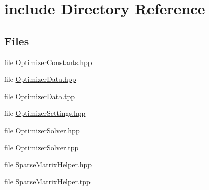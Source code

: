 \section{include Directory Reference}
\label{dir_d44c64559bbebec7f509842c48db8b23}
\subsection*{Files}
\begin{DoxyCompactItemize}
\item 
file \hyperlink{OptimizerConstants_8hpp}{Optimizer\+Constants.\+hpp}
\item 
file \hyperlink{OptimizerData_8hpp}{Optimizer\+Data.\+hpp}
\item 
file \hyperlink{OptimizerData_8tpp}{Optimizer\+Data.\+tpp}
\item 
file \hyperlink{OptimizerSettings_8hpp}{Optimizer\+Settings.\+hpp}
\item 
file \hyperlink{OptimizerSolver_8hpp}{Optimizer\+Solver.\+hpp}
\item 
file \hyperlink{OptimizerSolver_8tpp}{Optimizer\+Solver.\+tpp}
\item 
file \hyperlink{SparseMatrixHelper_8hpp}{Sparse\+Matrix\+Helper.\+hpp}
\item 
file \hyperlink{SparseMatrixHelper_8tpp}{Sparse\+Matrix\+Helper.\+tpp}
\end{DoxyCompactItemize}
